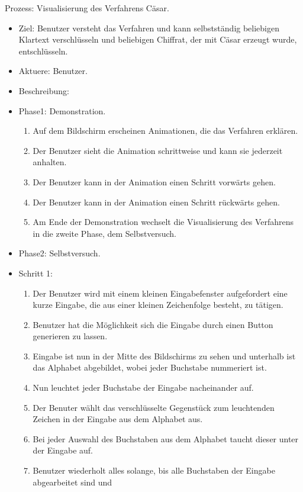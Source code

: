 \documentclass{article}
\begin{document}
\begin{FA}[start=110]
 \item Prozess: Visualisierung des Verfahrens Cäsar.
\end{FA}
\begin{itemize}[label={}]
 \item Ziel: Benutzer versteht das Verfahren und kann selbstständig 
 beliebigen Klartext verschlüsseln und beliebigen Chiffrat, der mit Cäsar erzeugt wurde, entschlüsseln.
 \item Aktuere: Benutzer.
 \item Beschreibung:
 \item Phase1: Demonstration.
\begin{enumerate}[]
 \item Auf dem Bildschirm erscheinen Animationen, die das Verfahren erklären.
 \item Der Benutzer sieht die Animation schrittweise und kann sie jederzeit anhalten.
 \item Der Benutzer kann in der Animation einen Schritt vorwärts gehen.
 \item Der Benutzer kann in der Animation einen Schritt rückwärts gehen. 
 \item Am Ende der Demonstration wechselt die Visualisierung des Verfahrens in die zweite Phase, dem Selbstversuch.
\end{enumerate}
 \item Phase2: Selbstversuch.
 \item Schritt 1:
 \begin{enumerate}
  \item Der Benutzer wird mit einem kleinen Eingabefenster aufgefordert eine kurze Eingabe, 
        die aus einer kleinen Zeichenfolge besteht, zu tätigen.
  \item Benutzer hat die Möglichkeit sich die Eingabe durch einen Button generieren zu lassen.
  \item Eingabe ist nun in der Mitte des Bildschirms zu sehen und unterhalb ist das Alphabet 
        abgebildet, wobei jeder Buchstabe nummeriert ist.     
  \item Nun leuchtet jeder Buchstabe der Eingabe nacheinander auf.
  \item Der Benuter wählt das verschlüsselte Gegenstück zum leuchtenden Zeichen in der Eingabe aus dem Alphabet aus. 
  \item Bei jeder Auswahl des Buchstaben aus dem Alphabet taucht dieser unter der Eingabe auf.
  \item[] Benutzer wiederholt alles solange, bis alle Buchstaben der Eingabe abgearbeitet sind und 

\end{enumerate}
\end{itemize}
\end{document}
